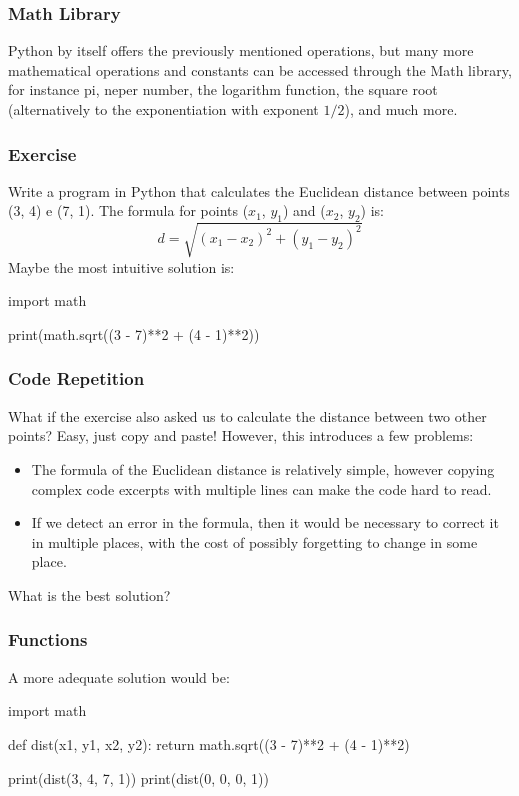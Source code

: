 \documentclass{beamer}
\begin{document}
\begin{frame}
    \frametitle{Math Library}
    Python by itself offers the previously mentioned operations, but many more
    mathematical operations and constants can be accessed through the Math
    library, for instance pi, neper number, the logarithm function, the square 
    root (alternatively to the exponentiation with exponent $1/2$), and much
    more.
\end{frame}


\begin{frame}[containsverbatim]
    \frametitle{Exercise}
    Write a program in Python that calculates the Euclidean distance between
    points (3, 4) e (7, 1). The formula for points ($x_1$, $y_1$) and ($x_2$, $y_2$)
    is:
    \vspace{2mm}
    \[ d = \sqrt{(x_1 - x_2)^2 + (y_1 - y_2)^2} \]
    \vspace{4mm}
    Maybe the most intuitive solution is:
    \begin{pythonlst}
        import math

        print(math.sqrt((3 - 7)**2 + (4 - 1)**2))
    \end{pythonlst}
\end{frame}

\begin{frame}
    \frametitle{Code Repetition}
    What if the exercise also asked us to calculate the distance between two
    other points? Easy, just copy and paste!
    \vspace{4mm}
    However, this introduces a few problems:
    \begin{itemize}
        \item The formula of the Euclidean distance is relatively simple, however
        copying complex code excerpts with multiple lines can make the code hard
        to read.
        \item If we detect an error in the formula, then it would be necessary
        to correct it in multiple places, with the cost of possibly forgetting
        to change in some place.
    \end{itemize}
    What is the best solution?
\end{frame}

\begin{frame}[containsverbatim]
    \frametitle{Functions}
    A more adequate solution would be:
    \begin{pythonlst}
        import math

        def dist(x1, y1, x2, y2):
            return math.sqrt((3 - 7)**2 + (4 - 1)**2)
        
        print(dist(3, 4, 7, 1))
        print(dist(0, 0, 0, 1))
    \end{pythonlst}
\end{frame}
\end{document}
